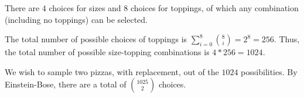 There are $4$ choices for sizes and $8$ choices for toppings, of which any
combination (including no toppings) can be selected.

The total number of possible choices of toppings is $\sum_{i=0}^{8}\binom{8}
{i} = 2^8 = 256$. Thus, the total number of possible size-topping combinations
is $4 * 256 = 1024$.

We wish to sample two pizzas, with replacement, out of the $1024$ possibilities.
By Einstein-Bose, there are a total of $\binom{1025}{2}$ choices.